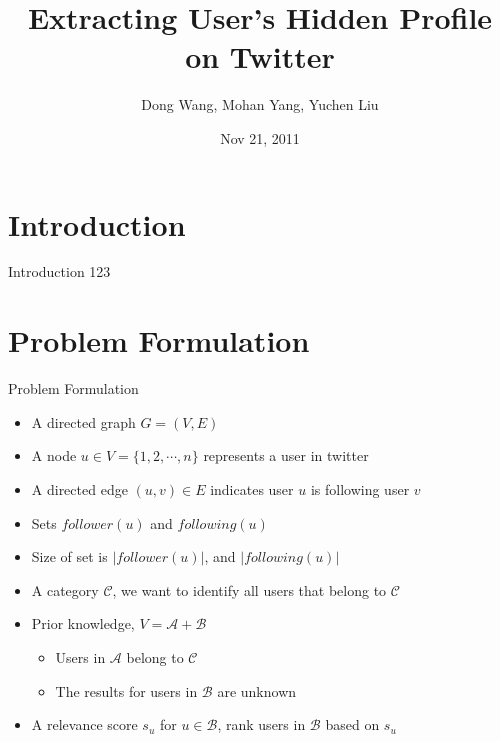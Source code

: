 \documentclass{beamer}
\begin{document}
\title{Extracting User's Hidden Profile on Twitter}
\author{Dong Wang, Mohan Yang, Yuchen Liu}
\date{Nov 21, 2011}

\newcommand{\following}{\ensuremath{following}}
\newcommand{\follower}{\ensuremath{follower}}
\newcommand{\at}{\emph{@}}


\begin{frame}
  \titlepage
\end{frame}


\section{Introduction}
\begin{frame}{Introduction}
123
\end{frame}

\section{Problem Formulation}
\begin{frame}{Problem Formulation}
\begin{itemize}
\item A directed graph $G = (V,E)$
\item A node $u \in V = \{1, 2, \cdots, n\}$ represents a user in twitter
\item A directed edge $(u,v) \in E$ indicates user $u$ is following user $v$
\item Sets $\follower(u)$ and $\following(u)$
\item Size of set is $|\follower(u)|$, and $|\following(u)|$
\end{itemize}
\pause

\begin{itemize}
\item A category $\mathcal{C}$, we want to identify all users that belong to $\mathcal{C}$
\item Prior knowledge, $V = \mathcal{A} + \mathcal{B}$
\begin{itemize}
\item Users in $\mathcal{A}$ belong to $\mathcal{C}$
\item The results for users in $\mathcal{B}$ are unknown
\end{itemize}
\item A relevance score $s_u$ for $u \in \mathcal{B}$, rank users in $\mathcal{B}$ based on $s_u$
\end{itemize}
\end{frame}
\end{document}
